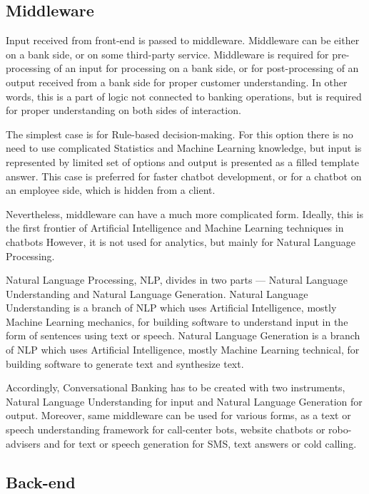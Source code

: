 \subsection{Middleware}

Input received from front-end is passed to middleware.
Middleware can be either on a bank side, or on some third-party service.
Middleware is required for pre-processing of an input for processing on a bank side, or for post-processing of an output received from a bank side for proper customer understanding.
In other words, this is a part of logic not connected to banking operations, but is required for proper understanding on both sides of interaction.

The simplest case is for Rule-based decision-making.
For this option there is no need to use complicated Statistics and Machine Learning knowledge, but input is represented by limited set of options and output is presented as a filled template answer.
This case is preferred for faster chatbot development, or for a chatbot on an employee side, which is hidden from a client. 

Nevertheless, middleware can have a much more complicated form.
Ideally, this is the first frontier of Artificial Intelligence and Machine Learning techniques in chatbots
However, it is not used for analytics, but mainly for Natural Language Processing.

Natural Language Processing, NLP, divides in two parts — Natural Language Understanding and Natural Language Generation.
Natural Language Understanding is a branch of NLP which uses Artificial Intelligence, mostly Machine Learning mechanics, for building software to understand input in the form of sentences using text or speech.
Natural Language Generation is a branch of NLP which uses Artificial Intelligence, mostly Machine Learning technical, for building software to generate text and synthesize text.

Accordingly, Conversational Banking has to be created with two instruments, Natural Language Understanding for input and Natural Language Generation for output.
Moreover, same middleware can be used for various forms, as a text or speech understanding framework for call-center bots, website chatbots or robo-advisers and for text or speech generation for SMS, text answers or cold calling.
 

\subsection{Back-end}

